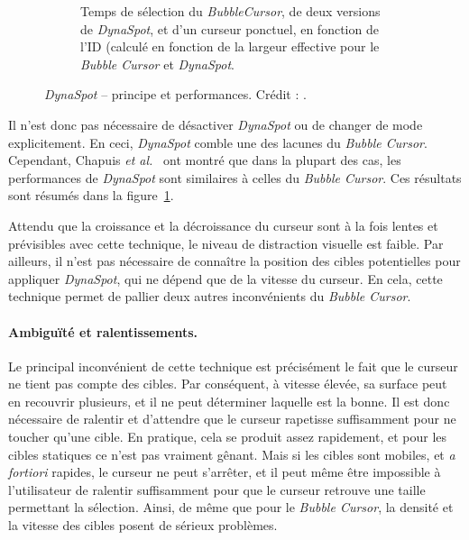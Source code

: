\begin{figure}[htbp]
\begin{subfigure}[t]{0.44\textwidth}
			\caption{Temps de sélection du \emph{BubbleCursor}, de deux versions de \emph{DynaSpot}, et d'un curseur ponctuel, en fonction de l'ID (calculé en fonction de la largeur effective pour le \emph{Bubble Cursor} et \emph{DynaSpot}.}
			\label{fig:dynaResults}
		\end{subfigure}
		\caption[\emph{DynaSpot} -- principe et performances]{\emph{DynaSpot} -- principe et performances. Crédit : \cite{chapuis2009dynaspot}.}
		\label{fig:dynaSpotRes}
	\end{figure}
	
	Il n'est donc pas nécessaire de désactiver \emph{DynaSpot} ou de changer de mode explicitement. En ceci, \emph{DynaSpot} comble une des lacunes du \emph{Bubble Cursor}. Cependant, Chapuis \emph{et al.}~\cite{chapuis2009dynaspot} ont montré que dans la plupart des cas, les performances de \emph{DynaSpot} sont similaires à celles du \emph{Bubble Cursor}. Ces résultats sont résumés dans la figure~\ref{fig:dynaResults}.

	Attendu que la croissance et la décroissance du curseur sont à la fois lentes et prévisibles avec cette technique, le niveau de distraction visuelle est faible. Par ailleurs, il n'est pas nécessaire de connaître la position des cibles potentielles pour appliquer \emph{DynaSpot}, qui ne dépend que de la vitesse du curseur. En cela, cette technique permet de pallier deux autres inconvénients du \emph{Bubble Cursor}.

	\paragraph{Ambiguïté et ralentissements.}
	Le principal inconvénient de cette technique est précisément le fait que le curseur ne tient pas compte des cibles. Par conséquent, à vitesse élevée, sa surface peut en recouvrir plusieurs, et il ne peut déterminer laquelle est la bonne. Il est donc nécessaire de ralentir et d'attendre que le curseur rapetisse suffisamment pour ne toucher qu'une cible. En pratique, cela se produit assez rapidement, et pour les cibles statiques ce n'est pas vraiment gênant. Mais si les cibles sont mobiles, et \emph{a fortiori} rapides, le curseur ne peut s'arrêter, et il peut même être impossible à l'utilisateur de ralentir suffisamment pour que le curseur retrouve une taille permettant la sélection. Ainsi, de même que pour le \emph{Bubble Cursor}, la densité et la vitesse des cibles posent de sérieux problèmes.

